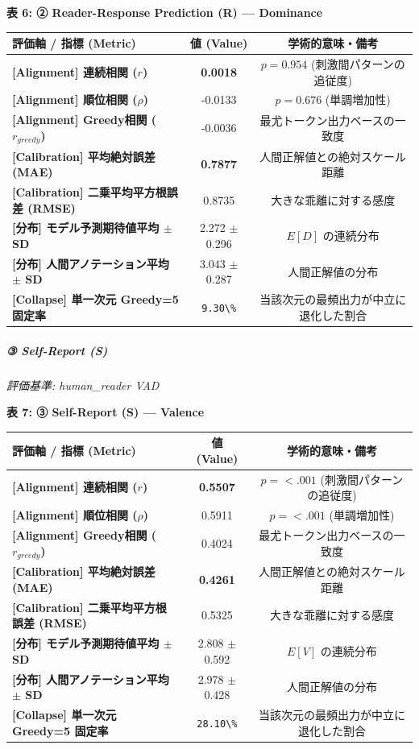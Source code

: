\textbf{表 6: ② Reader-Response Prediction (R) — Dominance}
\begin{center}
\small
\begin{tabular}{lcc}
\toprule
\textbf{評価軸 / 指標 (Metric)} & \textbf{値 (Value)} & \textbf{学術的意味・備考} \\
\midrule
\textbf{[Alignment] 連続相関 ($r$)} & \textbf{0.0018} & $p = 0.954 $ (刺激間パターンの追従度) \\
\textbf{[Alignment] 順位相関 ($\rho$)} & -0.0133 & $p = 0.676 $ (単調増加性) \\
\textbf{[Alignment] Greedy相関 ($r_{greedy}$)} & -0.0036 & 最尤トークン出力ベースの一致度 \\
\textbf{[Calibration] 平均絶対誤差 (MAE)} & \textbf{0.7877} & 人間正解値との絶対スケール距離 \\
\textbf{[Calibration] 二乗平均平方根誤差 (RMSE)} & 0.8735 & 大きな乖離に対する感度 \\
\textbf{[分布] モデル予測期待値平均 $\pm$ SD} & 2.272 $\pm$ 0.296 & $E[D]$ の連続分布 \\
\textbf{[分布] 人間アノテーション平均 $\pm$ SD} & 3.043 $\pm$ 0.287 & 人間正解値の分布 \\
\textbf{[Collapse] 単一次元 Greedy=5 固定率} & \texttt{9.30\textbackslash{}\%} & 当該次元の最頻出力が中立に退化した割合 \\
\bottomrule
\end{tabular}
\end{center}


\subparagraph{③ Self-Report (S)}
\textit{評価基準: human\_reader VAD}

\textbf{表 7: ③ Self-Report (S) — Valence}
\begin{center}
\small
\begin{tabular}{lcc}
\toprule
\textbf{評価軸 / 指標 (Metric)} & \textbf{値 (Value)} & \textbf{学術的意味・備考} \\
\midrule
\textbf{[Alignment] 連続相関 ($r$)} & \textbf{0.5507} & $p = <.001 $ (刺激間パターンの追従度) \\
\textbf{[Alignment] 順位相関 ($\rho$)} & 0.5911 & $p = <.001 $ (単調増加性) \\
\textbf{[Alignment] Greedy相関 ($r_{greedy}$)} & 0.4024 & 最尤トークン出力ベースの一致度 \\
\textbf{[Calibration] 平均絶対誤差 (MAE)} & \textbf{0.4261} & 人間正解値との絶対スケール距離 \\
\textbf{[Calibration] 二乗平均平方根誤差 (RMSE)} & 0.5325 & 大きな乖離に対する感度 \\
\textbf{[分布] モデル予測期待値平均 $\pm$ SD} & 2.808 $\pm$ 0.592 & $E[V]$ の連続分布 \\
\textbf{[分布] 人間アノテーション平均 $\pm$ SD} & 2.978 $\pm$ 0.428 & 人間正解値の分布 \\
\textbf{[Collapse] 単一次元 Greedy=5 固定率} & \texttt{28.10\textbackslash{}\%} & 当該次元の最頻出力が中立に退化した割合 \\
\bottomrule
\end{tabular}
\end{center}


